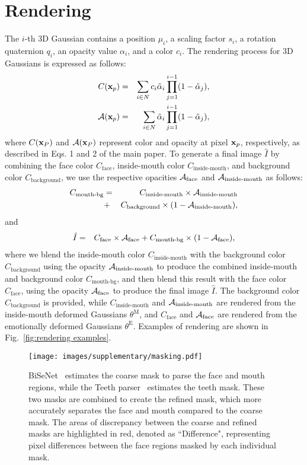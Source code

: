 \section{Rendering}
The $i$-th 3D Gaussian contains a position $\mu_i$, a scaling factor $s_i$, a rotation quaternion $q_i$, an opacity value $\alpha_i$, and a color $c_i$. The rendering process for 3D Gaussians is expressed as follows:
\begin{eqnarray}
    C(\mathbf{x}_p) &=& \sum_{i \in N} c_i \tilde{\alpha}_i \prod^{i-1}_{j=1} (1-\tilde{\alpha}_j),\\
    \mathcal{A}(\mathbf{x}_p) &=& \sum_{i \in N} \tilde{\alpha}_i \prod^{i-1}_{j=1} (1-\tilde{\alpha}_j),
\end{eqnarray}
where $C(\mathbf{x}_P)$ and $\mathcal{A}(\mathbf{x}_P)$ represent color and opacity at pixel $\mathbf{x}_p$, respectively, as described in Eqs. 1 and 2 of the main paper. To generate a final image $\hat{I}$ by combining the face color $C_\text{face}$, inside-mouth color $C_\text{inside-mouth}$, and background color $C_\text{background}$, we use the respective opacities $\mathcal{A}_\text{face}$ and $\mathcal{A}_\text{inside-mouth}$ as follows:
\begin{eqnarray}
    C_\text{mouth-bg} &=& C_\text{inside-mouth} \times \mathcal{A}_\text{inside-mouth} \nonumber \\
    &+& C_\text{background} \times (1-\mathcal{A}_\text{inside-mouth}),
    \label{eq:C mouth bg}
\end{eqnarray}
and 
\begin{eqnarray}
    \hat{I} &=& C_\text{face} \times \mathcal{A}_\text{face} + C_\text{mouth-bg} \times (1-\mathcal{A}_\text{face}),
    \label{eq:rendering final image}
\end{eqnarray}
where we blend the inside-mouth color $C_\text{inside-mouth}$ with the background color $C_\text{background}$ using the opacity $\mathcal{A}_\text{inside-mouth}$ to produce the combined inside-mouth and background color $C_\text{mouth-bg}$, and then blend this result with the face color $C_\text{face}$, using the opacity $\mathcal{A}_\text{face}$ to produce the final image $\hat{I}$. The background color $C_\text{background}$ is provided, while $C_\text{inside-mouth}$ and $\mathcal{A}_\text{inside-mouth}$ are rendered from the inside-mouth deformed Gaussians $\theta^\text{M}$, and $C_\text{face}$ and $\mathcal{A}_\text{face}$ are rendered from the emotionally deformed Gaussians $\theta^\text{E}$. Examples of rendering are shown in Fig.~\ref{fig:rendering examples}.

\begin{figure*}
    \centering
    \texttt{[image: images/supplementary/masking.pdf]}
    \caption{BiSeNet~\cite{yu2018bisenet} estimates the coarse mask to parse the face and mouth regions, while the Teeth parser~\cite{li2024talkinggaussian} estimates the teeth mask. These two masks are combined to create the refined mask, which more accurately separates the face and mouth compared to the coarse mask. The areas of discrepancy between the coarse and refined masks are highlighted in red, denoted as ``Difference", representing pixel differences between the face regions masked by each individual mask.}
    \label{fig:processing mask}
\end{figure*}

